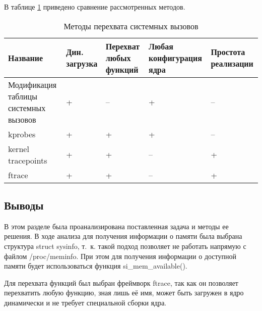 В таблице \ref{tab:analyze} приведено сравнение рассмотренных методов.

\begin{table}[h]
	\centering
	\captionsetup{justification=centering}
	\caption{\label{tab:analyze} Методы перехвата системных вызовов}
	\begin{tabular}{ | p{4cm} | p{2cm} | p{2cm} | p{2cm} | p{2cm} | }
		\hline
		Название & Дин. загрузка & Перехват любых функций & Любая конфигурация ядра & Простота реализации \\
		\hline
		Модификация таблицы системных вызовов & + & -- & + & -- \\
		\hline
		kprobes & + & + & + & -- \\
		\hline
		kernel tracepoints & + & + & -- & + \\
		\hline
		ftrace & + & + & -- & + \\
		\hline
	\end{tabular}
\end{table}

\subsection*{Выводы}

В этом разделе была проанализирована поставленная задача и методы ее решения. В ходе анализа для получения информации о памяти была выбрана структура struct sysinfo, т.~к. такой подход позволяет не работать напрямую с файлом /proc/meminfo. При этом для получения информации о доступной памяти будет использоваться функция si\_mem\_available().

Для перехвата функций был выбран фреймворк ftrace, так как он позволяет перехватить любую функцию, зная лишь её имя, может быть загружен в ядро динамически и не требует специальной сборки ядра.



